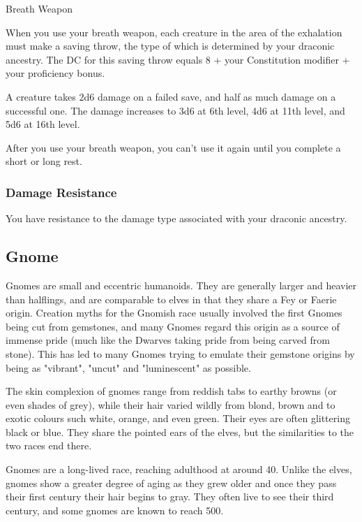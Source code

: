 \documentclass[10pt,twoside]{article}
\begin{document}
\begin{multicols}{2}
\begin{spellbox}{Breath Weapon}
    \begin{spellaction}[Effect]
    When you use your breath weapon, each creature in the area of the exhalation must make a saving throw, the type of which is determined by your draconic ancestry. The DC for this saving throw equals 8 + your Constitution modifier + your proficiency bonus.

    A creature takes 2d6 damage on a failed save, and half as much damage on a successful one. The damage increases to 3d6 at 6th level, 4d6 at 11th level, and 5d6 at 16th level.

    After you use your breath weapon, you can't use it again until you complete a short or long rest.
    \end{spellaction}
\end{spellbox}

\subsubsection*{Damage Resistance}
You have resistance to the damage type associated with your draconic ancestry.

\end{multicols}

\newpage


\subsection{Gnome}

Gnomes are small and eccentric humanoids. They are generally larger and heavier than halflings, and are comparable to elves in that they share a Fey or Faerie origin. Creation myths for the Gnomish race usually involved the first Gnomes being cut from gemstones, and many Gnomes regard this origin as a source of immense pride (much like the Dwarves taking pride from being carved from stone). This has led to many Gnomes trying to emulate their gemstone origins by being as "vibrant", "uncut" and "luminescent" as possible.

The skin complexion of gnomes range from reddish tabs to earthy browns (or even shades of grey), while their hair varied wildly from blond, brown and to exotic colours such white, orange, and even green. Their eyes are often glittering black or blue. They share the pointed ears of the elves, but the similarities to the two races end there.

Gnomes are a long-lived race, reaching adulthood at around 40. Unlike the elves, gnomes show a greater degree of aging as they grew older and once they pass their first century their hair begins to gray. They often live to see their third century, and some gnomes are known to reach 500.
\end{document}
